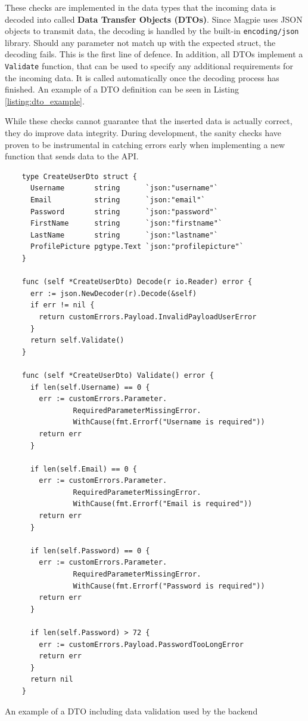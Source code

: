 These checks are implemented in the data types that the incoming data is decoded
into called \textbf{Data Transfer Objects (DTOs)}. Since Magpie uses JSON
objects to transmit data, the decoding is handled by the built-in
\texttt{encoding/json} library. Should any parameter not match up with the
expected struct, the decoding fails. This is the first line of defence. In
addition, all DTOs implement a \texttt{Validate} function, that can be used to
specify any additional requirements for the incoming data. It is called
automatically once the decoding process has finished. An example of a DTO
definition can be seen in Listing \ref{listing:dto_example}.

While these checks cannot guarantee that the inserted data is actually correct,
they do improve data integrity. During development, the sanity checks have
proven to be instrumental in catching errors early when implementing a new
function that sends data to the API.

\newpage{}

\begin{listing}[htbp]
  \centering{}
  \begin{minipage}{0.7\textwidth}
  \begin{verbatim}
    type CreateUserDto struct {
      Username       string      `json:"username"`
      Email          string      `json:"email"`
      Password       string      `json:"password"`
      FirstName      string      `json:"firstname"`
      LastName       string      `json:"lastname"`
      ProfilePicture pgtype.Text `json:"profilepicture"`
    }

    func (self *CreateUserDto) Decode(r io.Reader) error {
      err := json.NewDecoder(r).Decode(&self)
      if err != nil {
        return customErrors.Payload.InvalidPayloadUserError
      }
      return self.Validate()
    }

    func (self *CreateUserDto) Validate() error {
      if len(self.Username) == 0 {
        err := customErrors.Parameter.
                RequiredParameterMissingError.
                WithCause(fmt.Errorf("Username is required"))
        return err
      }

      if len(self.Email) == 0 {
        err := customErrors.Parameter.
                RequiredParameterMissingError.
                WithCause(fmt.Errorf("Email is required"))
        return err
      }

      if len(self.Password) == 0 {
        err := customErrors.Parameter.
                RequiredParameterMissingError.
                WithCause(fmt.Errorf("Password is required"))
        return err
      }

      if len(self.Password) > 72 {
        err := customErrors.Payload.PasswordTooLongError
        return err
      }
      return nil
    }

  \end{verbatim}
  \end{minipage}
  \caption{An example of a DTO including data validation used by the backend}
  \label{listing:dto_example}
\end{listing}

